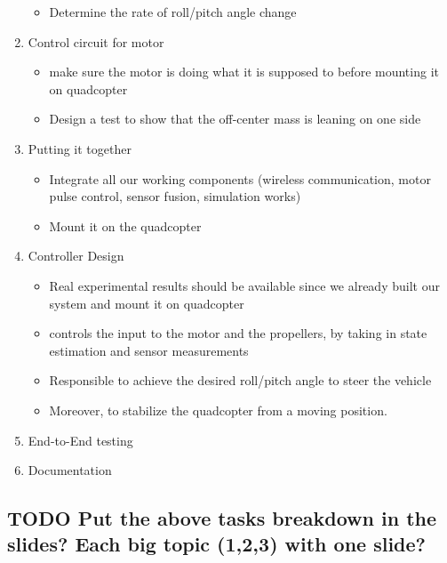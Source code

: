 \documentclass[11pt]{article}
\begin{document}
\begin{enumerate}
\begin{itemize}
\item Determine the rate of roll/pitch angle change
\end{itemize}
\item Control circuit for motor
\begin{itemize}
\item make sure the motor is doing what it is supposed to before mounting it on quadcopter
\item Design a test to show that the off-center mass is leaning on one side
\end{itemize}
\item Putting it together
\begin{itemize}
\item Integrate all our working components (wireless communication, motor pulse control, sensor fusion, simulation works)
\item Mount it on the quadcopter
\end{itemize}
\item Controller Design
\begin{itemize}
\item Real experimental results should be available since we already built our system and mount it on quadcopter
\item controls the input to the motor and the propellers, by taking in state estimation and sensor measurements
\item Responsible to achieve the desired roll/pitch angle to steer the vehicle
\item Moreover, to stabilize the quadcopter from a moving position.
\end{itemize}
\item End-to-End testing
\item Documentation
\end{enumerate}
\subsection{{\bfseries\sffamily TODO} Put the above tasks breakdown in the slides? Each big topic (1,2,3) with one slide?}
\label{sec:org0f6d4b6}
\end{document}
